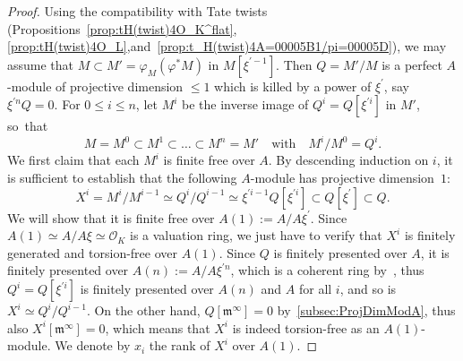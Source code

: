 \begin{proof}
Using the compatibility with Tate twists (Propositions~\ref{prop:tH(twist)4O_K^flat}, \ref{prop:tH(twist)4O_L},\linebreak and~\ref{prop:t_H(twist)4A=00005B1/pi=00005D}), we may assume that $M\subset M'=\varphi_{M}(\varphi^{\ast}M)$ in $M[\xi^{\prime-1}]$. Then $Q=M'/M$ is a perfect $A$-module of projective dimension $\leq1$ which is killed by a power of $\xi^{\prime}$, say $\xi^{\prime n}Q=0$. For $0\leq i\leq n$, let $M^{i}$ be the inverse image of $Q^{i}=Q[\xi^{\prime i}]$ in $M'$, so~that
\[
M=M^{0}\subset M^{1}\subset\dots\subset M^{n}=M'\quad\text{with}\quad M^{i}/M^{0}=Q^{i}.
\]
We first claim that each $M^{i}$ is finite free over $A$. By descending induction on $i$, it is sufficient to establish that the following $A$-module has projective dimension~$1$:
\[
X^{i}=M^{i}/M^{i-1}\simeq Q^{i}/Q^{i-1}\simeq\xi^{\prime i-1}Q[\xi^{\prime i}]\subset Q[\xi^{\prime}]\subset Q.
\]
We will show that it is finite free over $A(1):=A/A\xi^{\prime}$. Since $A(1)\simeq A/A\xi\simeq\mathcal{O}_{K}$ is a valuation ring, we just have to verify that $X^{i}$ is finitely generated and torsion-free over $A(1)$. Since $Q$ is finitely presented over $A$, it is finitely presented over $A(n):=A/A\xi^{\prime n}$, which is a coherent ring by~\cite[3.24]{BaMoSc16}, thus $Q^{i}=Q[\xi^{\prime i}]$ is finitely presented over $A(n)$ and $A$ for all $i$, and so is $X^{i}\simeq Q^{i}/Q^{i-1}$. On the other hand, $Q[\mathfrak{m}^{\infty}]=0$ by~\ref{subsec:ProjDimModA}, thus also $X^{i}[\mathfrak{m}^{\infty}]=0$, which means that $X^{i}$ is indeed torsion-free as an $A(1)$-module. We denote by $x_{i}$ the rank of $X^{i}$ over $A(1)$.


\end{proof}
